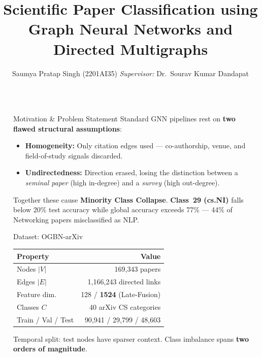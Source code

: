 \documentclass[final]{beamer}
\title{Scientific Paper Classification using Graph Neural Networks and Directed Multigraphs}
\author{Saumya Pratap Singh (2201AI35) \qquad
        \textit{Supervisor:} Dr.\ Sourav Kumar Dandapat}
\institute[IIT Patna]{Department of Computer Science \& Engineering,
                      Indian Institute of Technology Patna}
\newlength{\sepwidth}
\newlength{\colwidth}
\newcommand{\separatorcolumn}{\begin{column}{\sepwidth}\end{column}}
\begin{document}
\begin{frame}[t]
\begin{columns}[t]
\separatorcolumn

\begin{column}{\colwidth}

  \begin{alertblock}{Motivation \& Problem Statement}
    Standard GNN pipelines rest on \textbf{two flawed structural assumptions}:
    \begin{itemize}
      \item \textbf{Homogeneity:} Only citation edges used --- co-authorship,
            venue, and field-of-study signals discarded.
      \item \textbf{Undirectedness:} Direction erased, losing the distinction
            between a \emph{seminal paper} (high in-degree) and a
            \emph{survey} (high out-degree).
    \end{itemize}
    Together these cause \textbf{Minority Class Collapse}. \textbf{Class~29
    (cs.NI)} falls below 20\% test accuracy while global accuracy exceeds
    77\% --- 44\% of Networking papers misclassified as NLP.
  \end{alertblock}

  \begin{block}{Dataset: OGBN-arXiv}
    \begin{center}
    \begin{tabular}{lr}
      \toprule
      \textbf{Property} & \textbf{Value}\\
      \midrule
      Nodes $|V|$        & 169{,}343 papers\\
      Edges $|E|$        & 1{,}166{,}243 directed links\\
      Feature dim.       & 128 / \textbf{1524} (Late-Fusion)\\
      Classes $C$        & 40 arXiv CS categories\\
      Train / Val / Test & 90{,}941 / 29{,}799 / 48{,}603\\
      \bottomrule
    \end{tabular}
    \end{center}
    Temporal split: test nodes have sparser context.
    Class imbalance spans \textbf{two orders of magnitude}.


\end{block}
\end{column}
\end{columns}
\end{frame}
\end{document}
